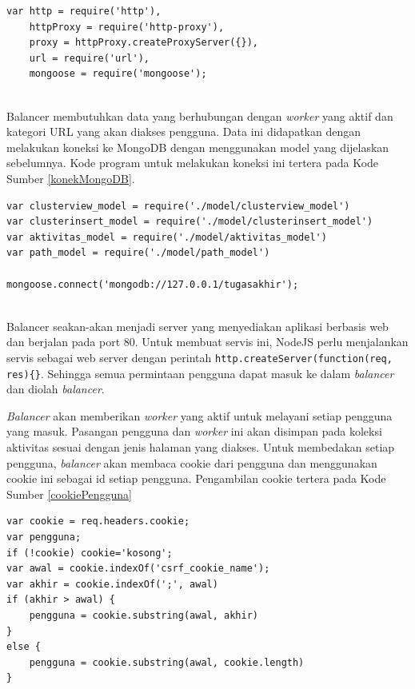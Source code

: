 \documentclass{ta-its}
\begin{document}
				\begin{lstlisting}[frame=single,tabsize=2,breaklines,caption={Paket untuk Balancer},label=paketBalancer]
var http = require('http'),
	httpProxy = require('http-proxy'),
	proxy = httpProxy.createProxyServer({}),
	url = require('url'),
	mongoose = require('mongoose');
				
				\end{lstlisting}
				
				Balancer membutuhkan data yang berhubungan dengan \textit{worker} yang aktif dan kategori URL yang akan diakses pengguna. Data ini didapatkan dengan melakukan koneksi ke MongoDB dengan menggunakan model yang dijelaskan sebelumnya. Kode program untuk melakukan koneksi ini tertera pada Kode Sumber \ref{konekMongoDB}.
				
				\begin{lstlisting}[frame=single,tabsize=2,breaklines,caption={Koneksi Balancer ke MongoDB},label=konekMongoDB]
var clusterview_model = require('./model/clusterview_model')
var clusterinsert_model = require('./model/clusterinsert_model')
var aktivitas_model = require('./model/aktivitas_model')
var path_model = require('./model/path_model')

mongoose.connect('mongodb://127.0.0.1/tugasakhir');
				
				\end{lstlisting}
				
				Balancer seakan-akan menjadi server yang menyediakan aplikasi berbasis web dan berjalan pada port 80. Untuk membuat servis ini, NodeJS perlu menjalankan servis sebagai web server dengan perintah \texttt{http.createServer(function(req, res)\{\}}. Sehingga semua permintaan pengguna dapat masuk ke dalam \textit{balancer} dan diolah \textit{balancer}.
				
				\textit{Balancer} akan memberikan \textit{worker} yang aktif untuk melayani setiap pengguna yang masuk. Pasangan pengguna dan \textit{worker} ini akan disimpan pada koleksi aktivitas sesuai dengan jenis halaman yang diakses. Untuk membedakan setiap pengguna, \textit{balancer} akan membaca cookie dari pengguna dan menggunakan cookie ini sebagai id setiap pengguna. Pengambilan cookie tertera pada Kode Sumber \ref{cookiePengguna}
				
				\begin{lstlisting}[frame=single,tabsize=2,breaklines,caption={Pengambilan Cookie Pengguna},label=cookiePengguna]
var cookie = req.headers.cookie;
var pengguna;
if (!cookie) cookie='kosong';
var awal = cookie.indexOf('csrf_cookie_name');
var akhir = cookie.indexOf(';', awal)
if (akhir > awal) {
	pengguna = cookie.substring(awal, akhir)
}
else {
	pengguna = cookie.substring(awal, cookie.length)
}

				
				\end{lstlisting}
				
\end{document}
